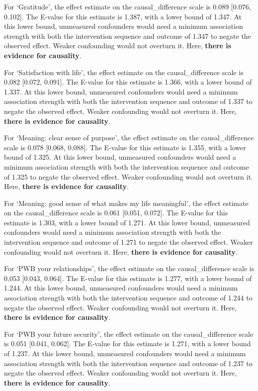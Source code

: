 \documentclass[
  single column]{article}
\begin{document}
For `Gratitude', the effect estimate on the causal\_difference scale is
0.089 {[}0.076, 0.102{]}. The E-value for this estimate is 1.387, with a
lower bound of 1.347. At this lower bound, unmeasured confounders would
need a minimum association strength with both the intervention sequence
and outcome of 1.347 to negate the observed effect. Weaker confounding
would not overturn it. Here, \textbf{there is evidence for causality}.

For `Satisfaction with life', the effect estimate on the
causal\_difference scale is 0.082 {[}0.072, 0.091{]}. The E-value for
this estimate is 1.366, with a lower bound of 1.337. At this lower
bound, unmeasured confounders would need a minimum association strength
with both the intervention sequence and outcome of 1.337 to negate the
observed effect. Weaker confounding would not overturn it. Here,
\textbf{there is evidence for causality}.

For `Meaning: clear sense of purpose', the effect estimate on the
causal\_difference scale is 0.078 {[}0.068, 0.088{]}. The E-value for
this estimate is 1.355, with a lower bound of 1.325. At this lower
bound, unmeasured confounders would need a minimum association strength
with both the intervention sequence and outcome of 1.325 to negate the
observed effect. Weaker confounding would not overturn it. Here,
\textbf{there is evidence for causality}.

For `Meaning: good sense of what makes my life meaningful', the effect
estimate on the causal\_difference scale is 0.061 {[}0.051, 0.072{]}.
The E-value for this estimate is 1.303, with a lower bound of 1.271. At
this lower bound, unmeasured confounders would need a minimum
association strength with both the intervention sequence and outcome of
1.271 to negate the observed effect. Weaker confounding would not
overturn it. Here, \textbf{there is evidence for causality}.

For `PWB your relationships', the effect estimate on the
causal\_difference scale is 0.053 {[}0.043, 0.064{]}. The E-value for
this estimate is 1.277, with a lower bound of 1.244. At this lower
bound, unmeasured confounders would need a minimum association strength
with both the intervention sequence and outcome of 1.244 to negate the
observed effect. Weaker confounding would not overturn it. Here,
\textbf{there is evidence for causality}.

For `PWB your future security', the effect estimate on the
causal\_difference scale is 0.051 {[}0.041, 0.062{]}. The E-value for
this estimate is 1.271, with a lower bound of 1.237. At this lower
bound, unmeasured confounders would need a minimum association strength
with both the intervention sequence and outcome of 1.237 to negate the
observed effect. Weaker confounding would not overturn it. Here,
\textbf{there is evidence for causality}.
\end{document}

